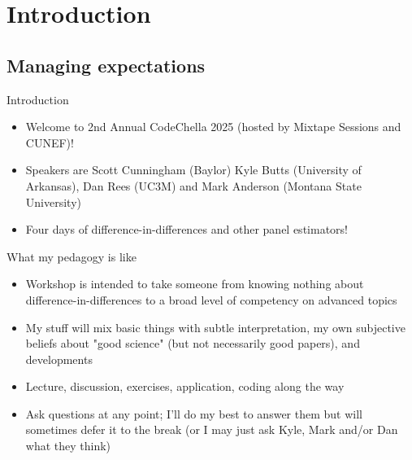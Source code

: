 \documentclass{beamer}
\begin{document}



\section{Introduction}

\subsection{Managing expectations}


\begin{frame}{Introduction}

\begin{itemize}
\item Welcome to 2nd Annual CodeChella 2025 (hosted by Mixtape Sessions and CUNEF)!
\item Speakers are Scott Cunningham (Baylor) Kyle Butts (University of Arkansas), Dan Rees (UC3M) and Mark Anderson (Montana State University)
\item Four days of difference-in-differences and other panel estimators!
\end{itemize}

\end{frame}


\begin{frame}{What my pedagogy is like}

\begin{itemize}
\item Workshop is intended to take someone from knowing nothing about difference-in-differences to a broad level of competency on advanced topics
\item My stuff will mix basic things with subtle interpretation, my own subjective beliefs about "good science" (but not necessarily good papers), and developments
\item Lecture, discussion, exercises, application, coding along the way
\item Ask questions at any point; I'll do my best to answer them but will sometimes defer it to the break (or I may just ask Kyle, Mark and/or Dan what they think)
\end{itemize}

\end{frame}
\end{document}

